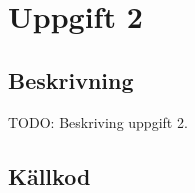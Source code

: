 \section{Uppgift 2}\label{uppgift-2}

\subsection{Beskrivning}
TODO: Beskriving uppgift 2.

\subsection{Källkod}\label{uppgift-2_src}
\inputminted[]{java}{../src/Lab1Uppg02.java}
